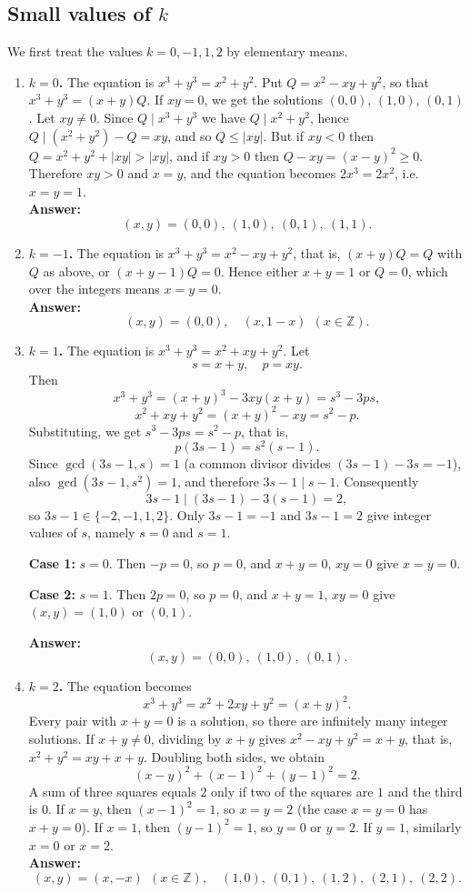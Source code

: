 \subsection{Small values of \texorpdfstring{$k$}{k}}
We first treat the values $k=0,-1,1,2$ by elementary means.
\begin{enumerate}
    \item \textbf{$k=0$.} The equation is $x^3+y^3=x^2+y^2$. Put $Q=x^2-xy+y^2$, so that $x^3+y^3=(x+y)Q$. If $xy=0$, we get the solutions $(0,0)$, $(1,0)$, $(0,1)$. Let $xy\neq 0$. Since $Q\mid x^3+y^3$ we have $Q\mid x^2+y^2$, hence $Q\mid (x^2+y^2)-Q=xy$, and so $Q\le |xy|$. But if $xy<0$ then $Q=x^2+y^2+|xy|>|xy|$, and if $xy>0$ then $Q-xy=(x-y)^2\ge 0$. Therefore $xy>0$ and $x=y$, and the equation becomes $2x^3=2x^2$, i.e.\ $x=y=1$.
    \\
    \textbf{Answer:}
\[
(x,y) = (0,0),\ (1,0),\ (0,1),\ (1,1).
\]
    \item \textbf{$k=-1$.} The equation is $x^3+y^3=x^2-xy+y^2$, that is, $(x+y)Q=Q$ with $Q$ as above, or $(x+y-1)Q=0$. Hence either $x+y=1$ or $Q=0$, which over the integers means $x=y=0$.
    \\
    \textbf{Answer:}
\[
(x,y) = (0,0),\quad (x,1-x)\ \ (x\in\mathbb Z).
\]
    \item \textbf{$k=1$.} The equation is $x^3+y^3=x^2+xy+y^2$. Let
\[
s = x + y, \quad p = xy.
\]
Then
\[
x^3 + y^3 = (x+y)^3 - 3xy(x+y) = s^3 - 3ps,
\]
\[
x^2 + xy + y^2 = (x+y)^2 - xy = s^2 - p.
\]
Substituting, we get $s^3 - 3ps = s^2 - p$, that is,
\[
p(3s - 1) = s^2(s - 1).
\]
Since $\gcd(3s-1,s)=1$ (a common divisor divides $(3s-1)-3s=-1$), also $\gcd(3s-1,s^2)=1$, and therefore $3s-1\mid s-1$. Consequently
\[
3s-1 \mid (3s-1)-3(s-1)=2,
\]
so $3s-1\in\{-2,-1,1,2\}$. Only $3s-1=-1$ and $3s-1=2$ give integer values of $s$, namely $s=0$ and $s=1$.

\textbf{Case 1:} $s = 0$. Then $-p = 0$, so $p=0$, and $x + y = 0$, $xy = 0$ give $x = y = 0$.

\textbf{Case 2:} $s = 1$. Then $2p = 0$, so $p=0$, and $x + y = 1$, $xy = 0$ give $(x,y) = (1,0)$ or $(0,1)$.

\textbf{Answer:}
\[
(x,y) = (0,0),\ (1,0),\ (0,1).
\]
    \item \textbf{$k=2$.} The equation becomes
\[
x^3+y^3=x^2+2xy+y^2=(x+y)^2.
\]
Every pair with $x+y=0$ is a solution, so there are infinitely many integer solutions. If $x+y\ne 0$, dividing by $x+y$ gives $x^2-xy+y^2=x+y$, that is, $x^2+y^2=xy+x+y$. Doubling both sides, we obtain
\[
(x-y)^2+(x-1)^2+(y-1)^2=2.
\]
A sum of three squares equals $2$ only if two of the squares are $1$ and the third is $0$. If $x=y$, then $(x-1)^2=1$, so $x=y=2$ (the case $x=y=0$ has $x+y=0$). If $x=1$, then $(y-1)^2=1$, so $y=0$ or $y=2$. If $y=1$, similarly $x=0$ or $x=2$.
    \\
    \textbf{Answer:}
\[
(x,y) = (x,-x)\ \ (x\in\mathbb Z),\quad (1,0),\ (0,1),\ (1,2),\ (2,1),\ (2,2).
\]
\end{enumerate}
